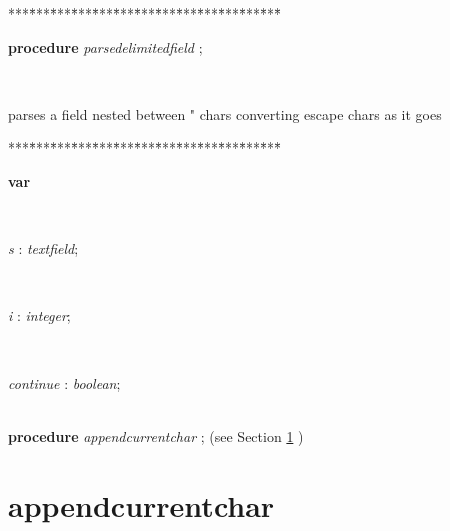 \begin{tabbing}
***\=***\=***\=***\=***\=***\=***\=***\=***\=***\=***\=***\=***\=\kill
\parbox{14cm}{\textsf{\textbf{procedure}  \textit{parsedelimitedfield} ;}}\\
\end{tabbing}
parses a field nested between " chars converting escape chars as it goes
\begin{tabbing}
***\=***\=***\=***\=***\=***\=***\=***\=***\=***\=***\=***\=***\=\kill
\\
\+\parbox{14cm}{\textsf{\textbf{var} }}\\
\parbox{14cm}{\textsf{\textit{s} : \textit{textfield}}; }\\
\parbox{14cm}{\textsf{\textit{i} : \textit{integer}}; }\\
\parbox{14cm}{\textsf{\textit{continue} : \textit{boolean}}; }\\
\<\textsf{\textbf{procedure}  \textit{appendcurrentchar} ;} (see Section \ref{sec:csvfilereader/getdatamatrix/recursedown/recurse/getcolheaders/recurse/getrowheaders/recurse/colcount/getcell/removetrailingnull/onlynulls/rowcount/isint/printcsv/parsecsvfile/thetoken/peek/isoneof/nextsymbol/have/haveoneof/initialise/resolvealpha/resolvedigits/resolvetoken/markbegin/markend/setalpha/emptyfield/parsebarefield/parsedelimitedfieldappendcurrentchar} )\\
\end{tabbing}
\section{appendcurrentchar}\label{sec:csvfilereader/getdatamatrix/recursedown/recurse/getcolheaders/recurse/getrowheaders/recurse/colcount/getcell/removetrailingnull/onlynulls/rowcount/isint/printcsv/parsecsvfile/thetoken/peek/isoneof/nextsymbol/have/haveoneof/initialise/resolvealpha/resolvedigits/resolvetoken/markbegin/markend/setalpha/emptyfield/parsebarefield/parsedelimitedfieldappendcurrentchar}

